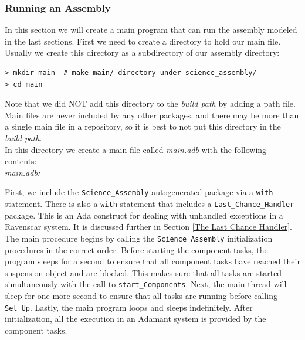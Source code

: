 \subsubsection{Running an Assembly} \label{Running an Assembly}

In this section we will create a main program that can run the assembly modeled in the last sections. First we need to create a directory to hold our main file. Usually we create this directory as a subdirectory of our assembly directory:

\vspace{5mm} %
\begin{verbatim}
> mkdir main  # make main/ directory under science_assembly/
> cd main 
\end{verbatim}
\vspace{5mm} %

Note that we did NOT add this directory to the \textit{build path} by adding a path file. Main files are never included by any other packages, and there may be more than a single main file in a repository, so it is best to not put this directory in the \textit{build path}. \\

In this directory we create a main file called \textit{main.adb} with the following contents: \\

\textit{main.adb:}

First, we include the \texttt{Science\_Assembly} autogenerated package via a \texttt{with} statement. There is also a \texttt{with} statement that includes a \texttt{Last\_Chance\_Handler} package. This is an Ada construct for dealing with unhandled exceptions in a Ravenscar system. It is discussed further in Section \ref{The Last Chance Handler}. \\

The main procedure begins by calling the \texttt{Science\_Assembly} initialization procedures in the correct order. Before starting the component tasks, the program sleeps for a second to ensure that all component tasks have reached their suspension object and are blocked. This makes sure that all tasks are started simultaneously with the call to \texttt{start\_Components}. Next, the main thread will sleep for one more second to ensure that all tasks are running before calling \texttt{Set\_Up}. Lastly, the main program loops and sleeps indefinitely. After initialization, all the execution in an Adamant system is provided by the component tasks. \\


